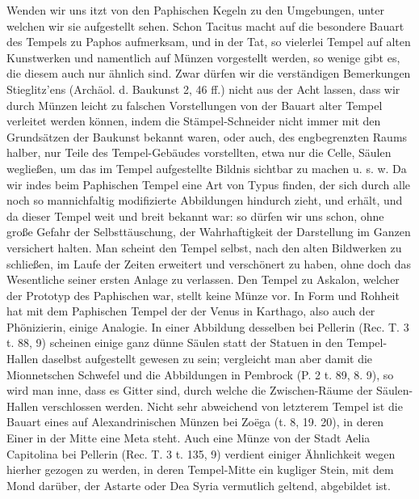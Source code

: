 \documentclass[a4paper, 11pt, oneside, polutonikogreek, german]{article}
\begin{document}
Wenden wir uns itzt von den Paphischen Kegeln zu den Umgebungen, unter welchen wir sie aufgestellt sehen. Schon Tacitus macht auf die besondere Bauart des Tempels zu Paphos aufmerksam, und in der Tat, so vielerlei Tempel auf alten Kunstwerken und namentlich auf Münzen vorgestellt werden, so wenige gibt es, die diesem auch nur ähnlich sind. Zwar dürfen wir die verständigen Bemerkungen Stieglitz'ens (Archäol. d. Baukunst 2, 46 ff.) nicht aus der Acht lassen, dass wir durch Münzen leicht zu falschen Vorstellungen von der Bauart alter Tempel verleitet werden können, indem die Stämpel-Schneider nicht immer mit den Grundsätzen der Baukunst bekannt waren, oder auch, des engbegrenzten Raums halber, nur Teile des Tempel-Gebäudes vorstellten, etwa nur die Celle, Säulen wegließen, um das im Tempel aufgestellte Bildnis sichtbar zu machen u. s. w. Da wir indes beim Paphischen Tempel eine Art von Typus finden, der sich durch alle noch so mannichfaltig modifizierte Abbildungen hindurch zieht, und erhält, und da dieser Tempel weit und breit bekannt war: so dürfen wir uns schon, ohne große Gefahr der Selbsttäuschung, der Wahrhaftigkeit der Darstellung im Ganzen versichert halten. Man scheint den Tempel selbst, nach den alten Bildwerken zu schließen, im Laufe der Zeiten erweitert und verschönert zu haben, ohne doch das Wesentliche seiner ersten Anlage zu verlassen. Den Tempel zu Askalon, welcher der Prototyp des Paphischen war, stellt keine Münze vor. In Form und Rohheit hat mit dem Paphischen Tempel der der Venus in Karthago, also auch der Phönizierin, einige Analogie. In einer Abbildung desselben bei Pellerin (Rec. T. 3 t. 88, 9) scheinen einige ganz dünne Säulen statt der Statuen in den Tempel-Hallen daselbst aufgestellt gewesen zu sein; vergleicht man aber damit die Mionnetschen Schwefel und die Abbildungen in Pembrock (P. 2 t. 89, 8. 9), so wird man inne, dass es Gitter sind, durch welche die Zwischen-Räume der Säulen-Hallen verschlossen werden. Nicht sehr abweichend von letzterem Tempel ist die Bauart eines auf Alexandrinischen Münzen bei Zoëga (t. 8, 19. 20), in deren Einer in der Mitte eine Meta steht. Auch eine Münze von der Stadt Aelia Capitolina bei Pellerin (Rec. T. 3 t. 135, 9) verdient einiger Ähnlichkeit wegen hierher gezogen zu werden, in deren Tempel-Mitte ein kugliger Stein, mit dem Mond darüber, der Astarte oder Dea Syria vermutlich geltend, abgebildet ist.
\end{document}
